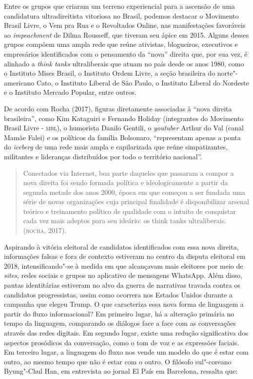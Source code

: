 Entre os grupos que criaram um terreno experiencial para a ascensão de
uma candidatura ultradireitista vitoriosa no Brasil, podemos destacar o
Movimento Brasil Livre, o Vem pra Rua e o Revoltados Online, nas
manifestações favoráveis ao \emph{impeachment} de Dilma Rousseff, que
tiveram seu ápice em 2015. Alguns desses grupos compõem uma ampla rede
que reúne ativistas, blogueiros, executivos e empresários identificados
com o pensamento da ``nova'' direita que, por sua vez, é alinhado a
\emph{think tanks} ultraliberais que atuam no país desde os anos 1980,
como o Instituto Mises Brasil, o Instituto Ordem Livre, a seção
brasileira do norte"-americano Cato, o Instituto Liberal de São Paulo, o
Instituto Liberal do Nordeste e o Instituto Mercado Popular, entre
outros.

De acordo com Rocha (2017), figuras diretamente associadas à ``nova
direita brasileira'', como Kim Kataguiri e Fernando Holiday (integrantes
do Movimento Brasil Livre - \textsc{mbl}), o humorista Danilo Gentili, o
\emph{youtuber} Arthur do Val (canal Mamãe Falei) e os políticos da
família Bolsonaro, ``representam apenas a ponta do \emph{iceberg} de uma
rede mais ampla e capilarizada que reúne simpatizantes, militantes e
lideranças distribuídos por todo o território nacional''.

\begin{quote}
Conectados via Internet, boa parte daqueles que passaram a compor a nova
direita foi sendo formada política e ideologicamente a partir da segunda
metade dos anos 2000, época em que começou a ser fundada uma série de
novas organizações cuja principal finalidade é disponibilizar arsenal
teórico e treinamento político de qualidade com o intuito de conquistar
cada vez mais adeptos para seu ideário: os think tanks ultraliberais.
(\textsc{rocha}, 2017).
\end{quote}

Aspirando à vitória eleitoral de candidatos identificados com essa nova
direita, informações falsas e fora de contexto estiveram no centro da
disputa eleitoral em 2018, intensificando"-se à medida em que alcançavam
mais eleitores por meio de \emph{sites,} redes sociais e grupos no
aplicativo de mensagens WhatsApp. Além disso, pautas identitárias
estiveram no alvo da guerra de narrativas travada contra os candidatos
progressistas, assim como ocorrera nos Estados Unidos durante a campanha
que elegeu Trump. O que caracteriza essa nova forma de linguagem a
partir do fluxo informacional? Em primeiro lugar, há a alteração
primária no tempo da linguagem, comparando os diálogos face a face com
as conversações através das redes digitais. Em segundo lugar, existe uma
redução significativa dos aspectos prosódicos da conversação, como o tom
de voz e as expressões faciais. Em terceiro lugar, a linguagem do fluxo
nos vende um modelo do que é estar com outro, ao mesmo tempo que não é
estar com o outro. O filósofo sul"-coreano Byung"-Chul Han, em entrevista
ao jornal El País em Barcelona, ressalta que:

